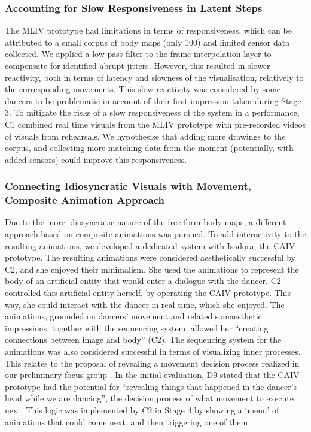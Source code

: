 \subsubsection{Accounting for Slow Responsiveness in Latent Steps}\label{subsec:modi_responsiveness_c1}

The MLIV prototype had limitations in terms of responsiveness, which can be attributed to a small corpus of body maps (only 100) and limited sensor data collected. We applied a low-pass filter to the frame interpolation layer to compensate for identified abrupt jitters. However, this resulted in slower reactivity, both in terms of latency and slowness of the visualisation, relatively to the corresponding movements. This slow reactivity was considered by some dancers to be problematic in account of their first impression taken during Stage 3. To mitigate the risks of a slow responsiveness of the system in a performance, C1 combined real time visuals from the MLIV prototype with pre-recorded videos of visuals from rehearsals. We hypothesise that adding more drawings to the corpus, and collecting more matching data from the moment (potentially, with added sensors) could improve this responsiveness.

\subsubsection{Connecting Idiosyncratic Visuals with Movement, Composite Animation Approach}

Due to the more idiosyncratic nature of the free-form body maps, a different approach based on composite animations was pursued. To add interactivity to the resulting animations, we developed a dedicated system with Isadora, the CAIV prototype. The resulting animations were considered aesthetically successful by C2, and she enjoyed their minimalism. She used the animations to represent the body of an artificial entity that would enter a dialogue with the dancer. C2 controlled this artificial entity herself, by operating the CAIV prototype. This way, she could interact with the dancer in real time, which she enjoyed. The animations, grounded on dancers’ movement and related somaesthetic impressions, together with the sequencing system, allowed her “creating connections between image and body” (C2). The sequencing system for the animations was also considered successful in terms of visualizing inner processes. This relates to the proposal of revealing a movement decision process realized in our preliminary focus group \cite{masu_how_2019}. In the initial evaluation, D9 stated that the CAIV prototype had the potential for “revealing things that happened in the dancer’s head while we are dancing”, the decision process of what movement to execute next. This logic was implemented by C2 in Stage 4 by showing a ‘menu’ of animations that could come next, and then triggering one of them.


